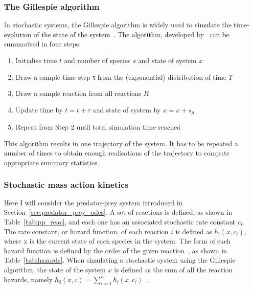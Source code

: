 \subsubsection{The Gillespie algorithm}
 In stochastic systems, the Gillespie algorithm is widely used to simulate the time-evolution of the state of the system~\autocite{Wilkinson:2006td}. The algorithm, developed by~\textcite{Gillespie:1977ww} can be summarised in four steps:
\begin{enumerate}
\item Initialise time $t$ and number of species $s$ and state of system $x$
\item Draw a sample time step τ from the (exponential) distribution of time $Τ$
\item Draw a sample reaction from all reactions $R$
\item Update time by $t = t + τ$ and state of system by $x = x + s_μ$
\item Repeat from Step 2 until total simulation time reached
\end{enumerate}
   
\noindent This algorithm results in one trajectory of the system. It has to be repeated a number of times to obtain enough realisations of the trajectory to compute appropriate summary statistics.

\subsubsection{Stochastic mass action kinetics}
Here I will consider the predator-prey system introduced in Section~\ref{sec:predator_prey_odes}. A set of reactions is defined, as shown in Table~\ref{tab:pp_reac}, and each one has an associated stochastic rate constant $c_i$. The rate constant, or hazard function, of each reaction $i$ is defined as $h_i(x, c_i)$, where x is the current state of each species in the system. The form of each hazard function is defined by the order of the given reaction~\autocite{Wilkinson:2006td}, as shown in Table~\ref{tab:hazards}. When simulating a stochastic system using the Gillespie algorithm, the state of the system $x$ is defined as the sum of all the reaction hazards, namely $h_0(x, c) = \sum_{i=1}^{n}h_{i}(x, c_i)$~\autocite{Wilkinson:2006td}. 



